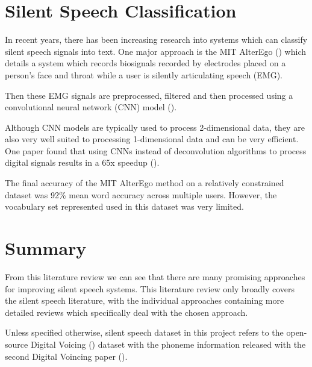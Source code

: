\section{Silent Speech Classification}

In recent years, there has been increasing research into systems
which can classify silent speech signals into text. One major approach
is the MIT AlterEgo (\cite{alter_ego}) which details a system which 
records biosignals recorded by electrodes placed on a person's face and
throat while a user is silently articulating speech (EMG).

Then these EMG signals are preprocessed, filtered and then processed
using a convolutional neural network (CNN) model (\cite{cnn_def}).

Although CNN models are typically used
to process 2-dimensional data, they are also very well suited
to processing 1-dimensional data and can be very efficient. One
paper found that using CNNs instead of deconvolution algorithms
to process digital signals results in a 65x speedup (\cite{cnn_dsp}).

The final accuracy of the MIT AlterEgo method on a relatively
constrained dataset was 92\% mean word accuracy across multiple
users. However, the vocabulary set represented used in this dataset
was very limited.

\section{Summary}

From this literature review we can see that there are many promising approaches
for improving silent speech systems. This literature review only broadly
covers the silent speech literature, with the individual approaches containing
more detailed reviews which specifically deal with the chosen approach.

Unless specified otherwise, silent speech dataset in this project
refers to the open-source Digital Voicing (\cite{gaddy2020digital})
dataset with the phoneme information
released with the second Digital Voincing paper (\cite{gaddy2021improved}).